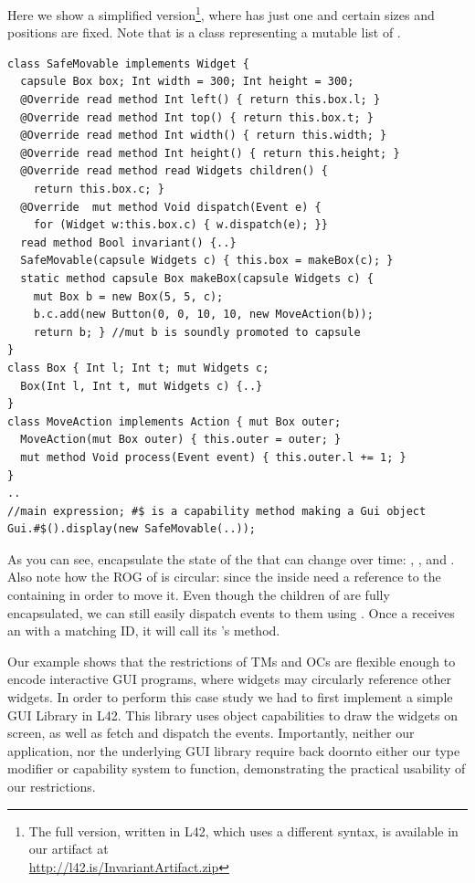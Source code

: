 Here we show a simplified version\footnote{The full version, written in L42, which uses a different syntax, is available in our artifact at\\ \url{http://l42.is/InvariantArtifact.zip}}, where  \Q@SafeMovable@ has just one \Q@Button@\IODel{,} and certain sizes and positions are fixed. Note that \Q@Widgets@ is a class representing a mutable list of \Q@mut@ \Q@Widget@s.
\begin{lstlisting}[mathescape=false]
class SafeMovable implements Widget {
  capsule Box box; Int width = 300; Int height = 300;
  @Override read method Int left() { return this.box.l; }
  @Override read method Int top() { return this.box.t; }
  @Override read method Int width() { return this.width; }
  @Override read method Int height() { return this.height; }
  @Override read method read Widgets children() {
    return this.box.c; }
  @Override  mut method Void dispatch(Event e) {
    for (Widget w:this.box.c) { w.dispatch(e); }}
  read method Bool invariant() {..}
  SafeMovable(capsule Widgets c) { this.box = makeBox(c); }
  static method capsule Box makeBox(capsule Widgets c) {
    mut Box b = new Box(5, 5, c);
    b.c.add(new Button(0, 0, 10, 10, new MoveAction(b));
    return b; } //mut b is soundly promoted to capsule
}
class Box { Int l; Int t; mut Widgets c;
  Box(Int l, Int t, mut Widgets c) {..}
}
class MoveAction implements Action { mut Box outer;
  MoveAction(mut Box outer) { this.outer = outer; }
  mut method Void process(Event event) { this.outer.l += 1; }
}
..
//main expression; #$ is a capability method making a Gui object
Gui.#$().display(new SafeMovable(..));
\end{lstlisting}

As you can see, \Q@Box@es encapsulate the state of the \Q@SafeMovable@s that can change over time:
\Q@left@, \Q@top@, and \Q@children@. Also note how the ROG of \Q@Box@ is circular: since
the \Q@MoveAction@s inside \Q@Button@s need a reference to the containing \Q@Box@ in order to move it.
Even though the children of \Q@SafeMovable@s are fully encapsulated, we can still easily dispatch events to them using \Q@dispatch@. Once a \Q@Button@ receives an \Q@Event@ with a matching ID, it will call its \Q@Action@'s \Q@process@ method. 

Our example shows that the restrictions of TMs and OCs are flexible enough to encode interactive GUI programs, where widgets may circularly reference other widgets.
In order to perform this case study we had to first implement a simple GUI Library in L42. This library uses object capabilities to draw the widgets on screen, as well as fetch and dispatch the events. Importantly, neither our application, nor the underlying GUI library require back doornto either our type modifier or capability system to function, demonstrating the practical usability of our restrictions.


